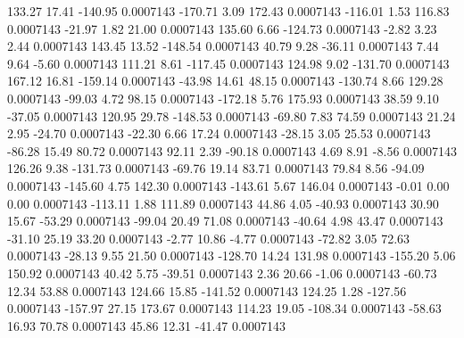       133.27       17.41     -140.95     0.0007143
     -170.71        3.09      172.43     0.0007143
     -116.01        1.53      116.83     0.0007143
      -21.97        1.82       21.00     0.0007143
      135.60        6.66     -124.73     0.0007143
       -2.82        3.23        2.44     0.0007143
      143.45       13.52     -148.54     0.0007143
       40.79        9.28      -36.11     0.0007143
        7.44        9.64       -5.60     0.0007143
      111.21        8.61     -117.45     0.0007143
      124.98        9.02     -131.70     0.0007143
      167.12       16.81     -159.14     0.0007143
      -43.98       14.61       48.15     0.0007143
     -130.74        8.66      129.28     0.0007143
      -99.03        4.72       98.15     0.0007143
     -172.18        5.76      175.93     0.0007143
       38.59        9.10      -37.05     0.0007143
      120.95       29.78     -148.53     0.0007143
      -69.80        7.83       74.59     0.0007143
       21.24        2.95      -24.70     0.0007143
      -22.30        6.66       17.24     0.0007143
      -28.15        3.05       25.53     0.0007143
      -86.28       15.49       80.72     0.0007143
       92.11        2.39      -90.18     0.0007143
        4.69        8.91       -8.56     0.0007143
      126.26        9.38     -131.73     0.0007143
      -69.76       19.14       83.71     0.0007143
       79.84        8.56      -94.09     0.0007143
     -145.60        4.75      142.30     0.0007143
     -143.61        5.67      146.04     0.0007143
       -0.01        0.00        0.00     0.0007143
     -113.11        1.88      111.89     0.0007143
       44.86        4.05      -40.93     0.0007143
       30.90       15.67      -53.29     0.0007143
      -99.04       20.49       71.08     0.0007143
      -40.64        4.98       43.47     0.0007143
      -31.10       25.19       33.20     0.0007143
       -2.77       10.86       -4.77     0.0007143
      -72.82        3.05       72.63     0.0007143
      -28.13        9.55       21.50     0.0007143
     -128.70       14.24      131.98     0.0007143
     -155.20        5.06      150.92     0.0007143
       40.42        5.75      -39.51     0.0007143
        2.36       20.66       -1.06     0.0007143
      -60.73       12.34       53.88     0.0007143
      124.66       15.85     -141.52     0.0007143
      124.25        1.28     -127.56     0.0007143
     -157.97       27.15      173.67     0.0007143
      114.23       19.05     -108.34     0.0007143
      -58.63       16.93       70.78     0.0007143
       45.86       12.31      -41.47     0.0007143
